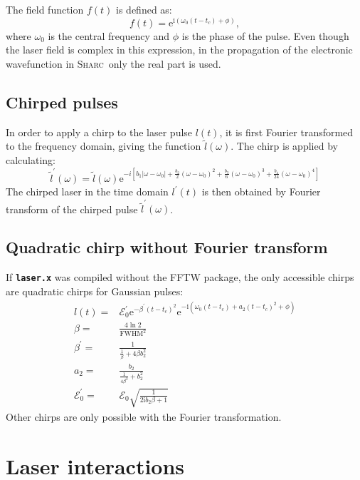 \documentclass[a4paper,11pt,DIV=15,openany,twoside=false]{scrbook}
\newcommand{\sharc}{\textsc{Sharc}}
\newcommand{\ttt}[1]{\textbf{\texttt{#1}}}
\newcommand{\E}{\ensuremath{\mathrm{e}}}
\newcommand{\I}{\ensuremath{\mathrm{i}}}
\begin{document}
The field function $f(t)$ is defined as:
\begin{equation}
  f(t)=\E^{\I \left(\omega_0(t-t_c)+\phi\right)},
\end{equation}
where $\omega_0$ is the central frequency and $\phi$ is the phase of the pulse. Even though the laser field is complex in this expression, in the propagation of the electronic wavefunction in \sharc\ only the real part is used.

\subsection{Chirped pulses}

In order to apply a chirp to the laser pulse $l(t)$, it is first Fourier transformed to the frequency domain, giving the function $\tilde{l}(\omega)$. The chirp is applied by calculating:
\begin{equation}
  \tilde{l}^\prime(\omega)=
  \tilde{l}(\omega)
  \E^{-i\left[
  b_1|\omega-\omega_0|
  +\frac{b_2}{2}(\omega-\omega_0)^2
  +\frac{b_3}{6}(\omega-\omega_0)^3
  +\frac{b_4}{24}(\omega-\omega_0)^4
  \right]}\label{eq:laser_chirp}
\end{equation}
The chirped laser in the time domain $l^\prime(t)$ is then obtained by Fourier transform of the chirped pulse $\tilde{l}^\prime(\omega)$.


\subsection{Quadratic chirp without Fourier transform}

If \ttt{laser.x} was compiled without the FFTW package, the only accessible chirps are quadratic chirps for Gaussian pulses:
\begin{align}
  l(t)=&
  \mathcal{E}_0^\prime
  \E^{-\beta^\prime(t-t_c)^2}
  \E^{-\I\left(
    \omega_0(t-t_c)+a_2(t-t_c)^2+\phi
  \right)}\\
  \beta=&\frac{4\ln 2}{\mathrm{FWHM}^2}\\
  \beta^\prime=&\frac{1}{\frac{1}{\beta}+4\beta b_2^2}\\
  a_2=&\frac{b_2}{\frac{1}{4\beta^2}+b^2_2}\\
  \mathcal{E}_0^\prime=&\mathcal{E}_0\sqrt{\frac{1}{2\I b_2\beta+1}}
\end{align}
Other chirps are only possible with the Fourier transformation.


\section{Laser interactions}\label{met:laser}
\end{document}
